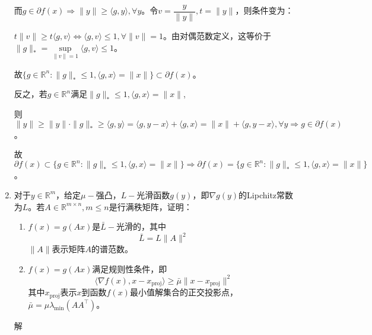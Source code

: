 \documentclass[cn,hazy,cyan,11pt,normal]{elegantnote}
\begin{document}
\begin{enumerate}
\begin{itemize}
            \end{itemize}
            而$g\in\partial f(x)\Rightarrow \|y\|\geq\langle g,y\rangle,\forall y$。令$v=\dfrac{y}{\|y\|},t=\|y\|$，则条件变为：

            $t\|v\|\geq t\langle g,v\rangle\Leftrightarrow \langle g,v\rangle\leq1,\forall \|v\|=1$。由对偶范数定义，这等价于$\|g\|_*=\sup\limits_{\|v\|=1}\langle g,v \rangle\leq1$。

            故$\{g\in\mathbb{R}^n: \|g\|_*\leq1,\langle g,x\rangle=\|x\|\}\subset\partial f(x)$。

            反之，若$g\in\mathbb{R}^n$满足$\|g\|_*\leq1,\langle g,x \rangle=\|x\|$,

            则$\|y\|\geq\|y\|\cdot\|g\|_*\geq\langle g,y \rangle=\langle g,y-x \rangle+\langle g,x \rangle=\|x\|+\langle g,y-x \rangle,\forall y\Rightarrow g\in\partial f(x)$。

            故$\partial f(x)\subset\{g\in\mathbb{R}^n: \|g\|_*\leq1,\langle g,x\rangle=\|x\|\}\Rightarrow\partial f(x)=\{g\in\mathbb{R}^n:\|g\|_*\leq1,\langle g,x\rangle=\|x\|\}$。

        \item {\color{c1}\vspace{0.5cm}对于$y\in\mathbb{R}^m$，给定$\mu-$强凸，$L-$光滑函数$g(y)$，即$\nabla g(y)$的Lipchitz常数为$L$。若$A\in\mathbb{R}^{m\times n},m\leq n$是行满秩矩阵，证明：

            \begin{enumerate}
                \item $f(x)=g(Ax)$是$\bar{L}-$光滑的，其中
                    \[\bar{L}=L\|A\|^2\]
                    $\|A\|$表示矩阵$A$的谱范数。

                \item $f(x)=g(Ax)$满足规则性条件，即
                    \[\langle \nabla f(x),x-x_{\text{proj}} \rangle\geq\bar{\mu}\|x-x_{\text{proj}}\|^2\]
                    其中$x_{\text{proj}}$表示$x$到函数$f(x)$最小值解集合的正交投影点，$\bar{\mu}=\mu\lambda_{\min}(AA^{\top})$。
            \end{enumerate}}

            \vspace{0.5cm}\textcolor{c2}解


\end{enumerate}
\end{document}
